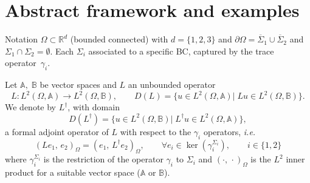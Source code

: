 \documentclass[aspectratio=169]{beamer}
\newcommand{\bbR}{\mathbb{R}}
\newcommand{\bbA}{\mathbb{A}}
\newcommand{\bbB}{\mathbb{B}}
\newcommand{\inner}[3][]{\ensuremath{( #2, \, #3 )_{#1}}}
\begin{document}
\section{Abstract framework and examples}
	
\begin{frame}{Notation}
	$\Omega\subset \bbR^d$ (bounded connected) with $d = \{1,2,3\}$  and  $\partial\Omega=  \overline{\Sigma}_1 \cup \overline{\Sigma}_2$ and $\Sigma_1 \cap \Sigma_2 = \emptyset$. Each $\Sigma_i$ associated to a specific BC, captured by the trace operator~$\gamma_i$.
	
	Let $\bbA, \; \bbB$ be vector spaces and $L$ an unbounded operator 
	\begin{equation*}
		L: L^2(\Omega, \bbA) \rightarrow L^2(\Omega, \bbB), \qquad
		D(L) = \{u \in L^2(\Omega, \bbA)|\; L u \in L^2(\Omega, \bbB)\}.
	\end{equation*} 
	We denote by $L^\dag$, with domain
	\begin{equation*}
		D(L^\dag) = \{u \in L^2(\Omega, \bbB)|\; L^\dag u \in L^2(\Omega, \bbA)\},
	\end{equation*}
	a formal adjoint operator of $L$ with respect to the $\gamma_i$ operators, \textit{i.e.} 
	$$
	\inner[\Omega]{L e_1}{e_2} = \inner[\Omega]{e_1}{L^\dag e_2}, \qquad \forall 
	e_i \in \ker \left( \gamma_i^{\Sigma_i} \right), \qquad i \in \{1,2\}
	$$
	where $\gamma_i^{\Sigma_i}$ is the restriction of the operator $\gamma_i$ to $\Sigma_i$ and $\inner[\Omega]{\cdot}{\cdot}$ is the $L^2$ inner product for a suitable vector space ($\bbA$ or $\bbB$).
	
\end{frame}	
\end{document}
